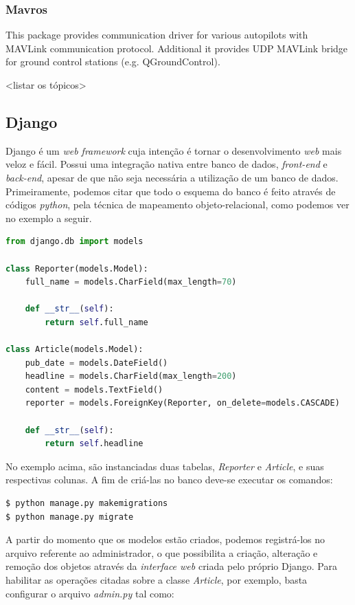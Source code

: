 \documentclass[12pt,a4paper,oneside]{book}
\begin{document}
\subsubsection{Mavros}

This package provides communication driver for various autopilots with MAVLink communication protocol. Additional it provides UDP MAVLink bridge for ground control stations (e.g. QGroundControl).

<listar os tópicos>

\subsection{Django}

Django é um \textit{web framework} cuja intenção é tornar o desenvolvimento \textit{web} mais veloz e fácil. Possui uma integração nativa entre banco de dados, \textit{front-end} e \textit{back-end}, apesar de que não seja necessária a utilização de um banco de dados. Primeiramente, podemos citar que todo o esquema do banco é feito através de códigos \textit{python}, pela técnica de mapeamento objeto-relacional, como podemos ver no exemplo a seguir\cite{django}.

\begin{lstlisting}[language=Python]
from django.db import models

class Reporter(models.Model):
    full_name = models.CharField(max_length=70)

    def __str__(self):
        return self.full_name

class Article(models.Model):
    pub_date = models.DateField()
    headline = models.CharField(max_length=200)
    content = models.TextField()
    reporter = models.ForeignKey(Reporter, on_delete=models.CASCADE)

    def __str__(self):
        return self.headline
\end{lstlisting}

No exemplo acima, são instanciadas duas tabelas, \textit{Reporter} e \textit{Article}, e suas respectivas colunas. A fim de criá-las no banco deve-se executar os comandos:

\begin{lstlisting}[language=bash] 
$ python manage.py makemigrations
$ python manage.py migrate
\end{lstlisting}

A partir do momento que os modelos estão criados, podemos registrá-los no arquivo referente ao administrador, o que possibilita a criação, alteração e remoção dos objetos através da \textit{interface web} criada pelo próprio Django. Para habilitar as operações citadas sobre a classe \textit{Article}, por exemplo, basta configurar o arquivo \textit{admin.py} tal como:
\end{document}
